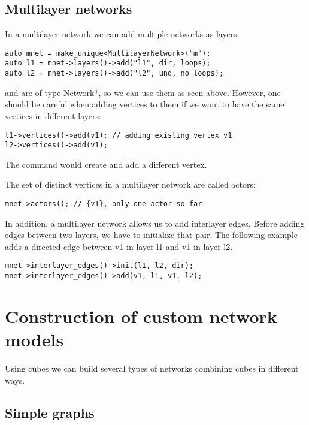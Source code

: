 \subsection{Multilayer networks}

In a multilayer network we can add multiple networks as layers:
\begin{lstlisting}[style=c++]
auto mnet = make_unique<MultilayerNetwork>("m");
auto l1 = mnet->layers()->add("l1", dir, loops);
auto l2 = mnet->layers()->add("l2", und, no_loops);
\end{lstlisting}

 and  are of type Network*, so we can use them as seen above. However, one should be careful when adding vertices to them if we want to have the same vertices in different layers:
\begin{lstlisting}[style=c++]
l1->vertices()->add(v1); // adding existing vertex v1
l2->vertices()->add(v1);
\end{lstlisting}
The command  would create and add a different vertex.

The set of distinct vertices in a multilayer network are called actors:
\begin{lstlisting}[style=c++]
mnet->actors(); // {v1}, only one actor so far
\end{lstlisting}

In addition, a multilayer network allows us to add interlayer edges. Before adding edges between two layers, we have to initialize that pair. The following example adds a directed edge between v1 in layer l1 and v1 in layer l2.
\begin{lstlisting}[style=c++]
mnet->interlayer_edges()->init(l1, l2, dir); 
mnet->interlayer_edges()->add(v1, l1, v1, l2);
\end{lstlisting}


\section{Construction of custom network models}\label{ch:nets:cubes}

Using cubes we can build several types of networks combining cubes in different ways. 

\subsection{Simple graphs}

